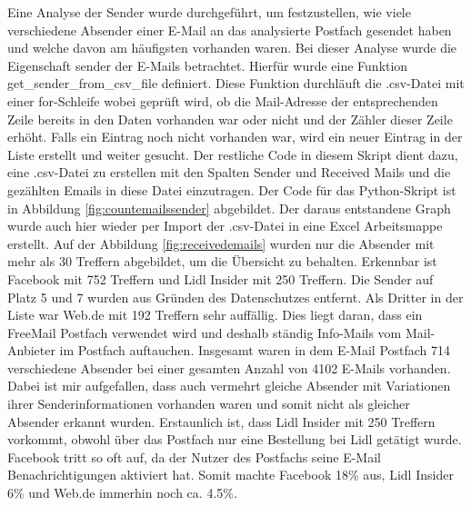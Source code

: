 Eine Analyse der Sender wurde durchgeführt, um festzustellen, wie viele verschiedene Absender einer E-Mail an das analysierte Postfach gesendet haben und welche davon am häufigsten vorhanden waren. Bei dieser Analyse wurde die Eigenschaft \glqq{}sender\grqq{} der E-Mails betrachtet. Hierfür wurde eine Funktion \glqq{}get\_sender\_from\_csv\_file\grqq{} definiert. Diese Funktion durchläuft die .csv-Datei mit einer for-Schleife wobei geprüft wird, ob die Mail-Adresse der entsprechenden Zeile bereits in den Daten vorhanden war oder nicht und der Zähler dieser Zeile erhöht. Falls ein Eintrag noch nicht vorhanden war, wird ein neuer Eintrag in der Liste erstellt und weiter gesucht. Der restliche Code in diesem Skript dient dazu, eine .csv-Datei zu erstellen mit den Spalten \glqq{}Sender\grqq{} und \glqq{}Received Mails\grqq{} und die gezählten Emails in diese Datei einzutragen. Der Code für das Python-Skript ist in Abbildung \ref{fig:countemailssender} abgebildet. \newline
Der daraus entstandene Graph wurde auch hier wieder per Import der .csv-Datei in eine Excel Arbeitsmappe erstellt. Auf der Abbildung \ref{fig:receivedemails} wurden nur die Absender mit mehr als 30 Treffern abgebildet, um die Übersicht zu behalten. Erkennbar ist Facebook mit 752 Treffern und Lidl Insider mit 250 Treffern. Die Sender auf Platz 5 und 7 wurden aus Gründen des Datenschutzes entfernt. Als Dritter in der Liste war Web.de mit 192 Treffern sehr auffällig. Dies liegt daran, dass ein FreeMail Postfach verwendet wird und deshalb ständig \glqq{}Info-Mails\grqq{} vom Mail-Anbieter im Postfach auftauchen. Insgesamt waren in dem E-Mail Postfach 714 verschiedene Absender bei einer gesamten Anzahl von 4102 E-Mails vorhanden. Dabei ist mir aufgefallen, dass auch vermehrt gleiche Absender mit Variationen ihrer Senderinformationen vorhanden waren und somit nicht als gleicher Absender erkannt wurden. Erstaunlich ist, dass Lidl Insider mit 250 Treffern vorkommt, obwohl über das Postfach nur eine Bestellung bei Lidl getätigt wurde. Facebook tritt so oft auf, da der Nutzer des Postfachs seine E-Mail Benachrichtigungen aktiviert hat. Somit machte Facebook 18\% aus, Lidl Insider 6\% und Web.de immerhin noch ca. 4.5\%. \newline

